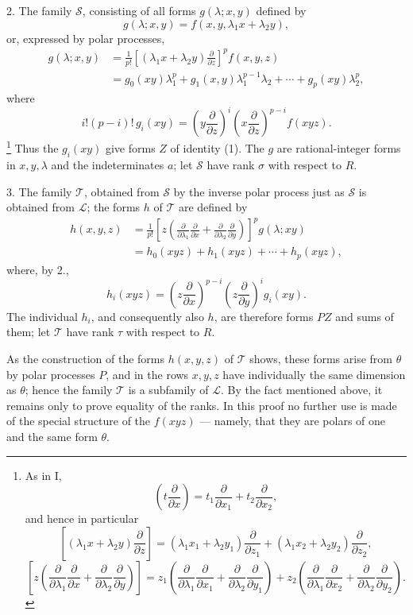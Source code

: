 2. The family $\mathcal S$, consisting of all forms $g(\lambda;x,y)$ defined by
\[
  g(\lambda;x,y)=f(x,y,\lambda_1x+\lambda_2y),
\]
or, expressed by polar processes,
\[
\begin{aligned}
  g(\lambda;x,y)
  &=\frac1{p!}\left[(\lambda_1x+\lambda_2y)\frac{\partial}{\partial z}\right]^p f(x,y,z) \\
  &=g_0(xy)\lambda_1^p+g_1(x,y)\lambda_1^{p-1}\lambda_2+\cdots+g_p(xy)\lambda_2^p,
\end{aligned}
\]
where
\[
  i!(p-i)!\,g_i(xy)=
  \left(y\frac{\partial}{\partial z}\right)^i
  \left(x\frac{\partial}{\partial z}\right)^{p-i}f(xyz).
\]
\footnote{As in I,
\[
 \left(t\frac{\partial}{\partial x}\right)=t_1\frac{\partial}{\partial x_1}+t_2\frac{\partial}{\partial x_2},
\]
and hence in particular
\[
 \left[(\lambda_1x+\lambda_2y)\frac{\partial}{\partial z}\right]
 = (\lambda_1x_1+\lambda_2y_1)\frac{\partial}{\partial z_1}
 + (\lambda_1x_2+\lambda_2y_2)\frac{\partial}{\partial z_2},
\]
\[
 \left[z\left(\frac{\partial}{\partial\lambda_1}\frac{\partial}{\partial x}
 +\frac{\partial}{\partial\lambda_2}\frac{\partial}{\partial y}\right)\right]
 =z_1\left(\frac{\partial}{\partial\lambda_1}\frac{\partial}{\partial x_1}
 +\frac{\partial}{\partial\lambda_2}\frac{\partial}{\partial y_1}\right)
 +z_2\left(\frac{\partial}{\partial\lambda_1}\frac{\partial}{\partial x_2}
 +\frac{\partial}{\partial\lambda_2}\frac{\partial}{\partial y_2}\right).
\]}
Thus the $g_i(xy)$ give forms $Z$ of identity (1). The $g$ are rational-integer forms in $x,y,\lambda$ and the indeterminates $a$; let $\mathcal S$ have rank $\sigma$ with respect to $R$.

3. The family $\mathcal T$, obtained from $\mathcal S$ by the inverse polar process just as $\mathcal S$ is obtained from $\mathcal L$; the forms $h$ of $\mathcal T$ are defined by
\[
\begin{aligned}
 h(x,y,z)
 &=\frac1{p!}\left[z\left(\frac{\partial}{\partial\lambda_1}\frac{\partial}{\partial x}
 +\frac{\partial}{\partial\lambda_2}\frac{\partial}{\partial y}\right)\right]^p g(\lambda;xy)\\
 &=h_0(xyz)+h_1(xyz)+\cdots+h_p(xyz),
\end{aligned}
\]
where, by 2.,
\[
  h_i(xyz)=
  \left(z\frac{\partial}{\partial x}\right)^{p-i}
  \left(z\frac{\partial}{\partial y}\right)^i g_i(xy).
\]
The individual $h_i$, and consequently also $h$, are therefore forms $PZ$ and sums of them; let $\mathcal T$ have rank $\tau$ with respect to $R$.

As the construction of the forms $h(x,y,z)$ of $\mathcal T$ shows, these forms arise from $\theta$ by polar processes $P$, and in the rows $x,y,z$ have individually the same dimension as $\theta$; hence the family $\mathcal T$ is a subfamily of $\mathcal L$. By the fact mentioned above, it remains only to prove equality of the ranks. In this proof no further use is made of the special structure of the $f(xyz)$ --- namely, that they are polars of one and the same form $\theta$.

